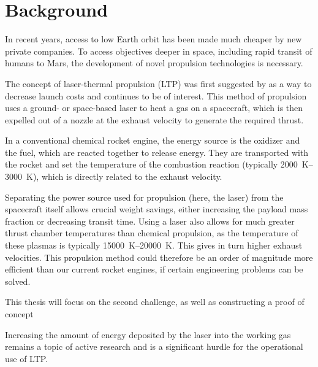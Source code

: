 \chapter{Background} \label{chp:background}

    In recent years, access to low Earth orbit has been made much cheaper by new private companies. To access objectives deeper in space, including rapid transit of humans to Mars, the development of novel propulsion technologies is necessary. 
    
    The concept of laser-thermal propulsion (LTP) was first suggested by \textcite{kantrowitzRelevanceSpace1971} as a way to decrease launch costs and continues to be of interest. This method of propulsion uses a ground- or space-based laser to heat a gas on a spacecraft, which is then expelled out of a nozzle at the exhaust velocity to generate the required thrust.

    In a conventional chemical rocket engine, the energy source is the oxidizer and the fuel, which are reacted together to release energy. They are transported with the rocket and set the temperature of the combustion reaction (typically \qtyrange{2000}{3000}{K}), which is directly related to the exhaust velocity.
    
    Separating the power source used for propulsion (here, the laser) from the spacecraft itself allows crucial weight savings, either increasing the payload mass fraction or decreasing transit time. Using a laser also allows for much greater thrust chamber temperatures than chemical propulsion, as the temperature of these plasmas is typically \qtyrange{15000}{20000}{K}. This gives in turn higher exhaust velocities. This propulsion method could therefore be an order of magnitude more efficient than our current rocket engines, if certain engineering problems can be solved.


    This thesis will focus on the second challenge, as well as constructing a proof of concept 
    

    Increasing the amount of energy deposited by the laser into the working gas remains a topic of active research and is a significant hurdle for the operational use of LTP.


